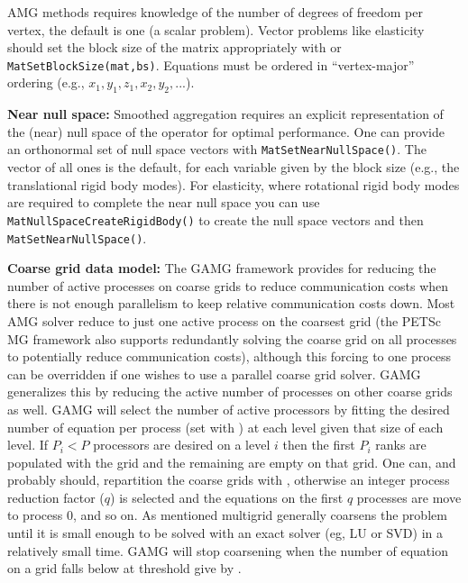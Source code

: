 AMG methods requires knowledge of the number of degrees of
freedom per vertex, the default is one (a scalar problem).
Vector problems like elasticity should set the block size of the matrix appropriately with   or \lstinline{MatSetBlockSize(mat,bs)}.
Equations must be ordered in ``vertex-major'' ordering (e.g., $x_1,y_1,z_1,x_2,y_2,...$).

{\bf Near null space:} Smoothed aggregation requires an explicit representation of the (near) null space of the operator for optimal performance.
One can provide an orthonormal set of null space vectors with \lstinline{MatSetNearNullSpace()}.
The vector of all ones is the default, for each variable given by the block size (e.g., the translational rigid  body modes).
For elasticity, where rotational rigid body modes are required to complete the near null space you can use \lstinline{MatNullSpaceCreateRigidBody()} to create the null space vectors and then \lstinline{MatSetNearNullSpace()}.

{\bf Coarse grid data model:} The GAMG framework provides for reducing the number of active processes on coarse grids to reduce communication costs when there is not enough parallelism to keep relative communication costs down.
Most AMG solver reduce to just one active process on the coarsest grid (the PETSc MG framework also supports redundantly solving the coarse grid on all processes to potentially reduce communication  costs), although this forcing to one process can be overridden if one wishes to use a parallel coarse grid solver.
GAMG generalizes this by reducing the active number of processes on other coarse grids as well.
GAMG will select the number of active processors by fitting the desired number of equation per process (set with ) at each level given that size of each level.
If $P_i < P$ processors are desired on a level $i$ then the first $P_i$ ranks are populated with the grid and the remaining are empty on that grid.
One can, and probably should, repartition the coarse grids with , otherwise an integer process reduction factor ($q$) is selected and the equations on the first $q$ processes are move to process 0, and so on.
As mentioned multigrid generally coarsens the problem until it is small enough to be solved with an exact solver (eg, LU or SVD) in a relatively small time.
GAMG will stop coarsening when the number of equation on a grid falls below at threshold give by .

